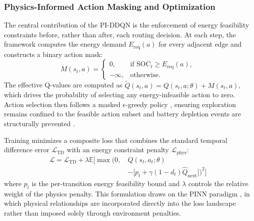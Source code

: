 \documentclass[conference]{IEEEtran}
\begin{document}
\subsubsection{Physics-Informed Action Masking and Optimization}
The central contribution of the PI-DDQN is the enforcement of energy feasibility constraints before, rather than after, each routing decision. At each step, the framework computes the energy demand $E_{\text{req}}(a)$ for every adjacent edge and constructs a binary action mask:
\begin{equation}
M(s_t, a) = 
\begin{cases}
0, & \text{if } \text{SOC}_t \ge E_{\text{req}}(a),\\
-\infty, & \text{otherwise.}
\end{cases}
\end{equation}
The effective Q-values are computed as $\tilde{Q}(s_t, a) = Q(s_t, a; \theta) + M(s_t, a)$, which drives the probability of selecting any energy-infeasible action to zero. Action selection then follows a masked $\epsilon$-greedy policy \cite{sutton2018rl}, ensuring exploration remains confined to the feasible action subset and battery depletion events are structurally prevented \cite{zhang2023ddqnper}.

Training minimizes a composite loss that combines the standard temporal difference error $\mathcal{L}_{\text{TD}}$ with an energy constraint penalty $\mathcal{L}_{\text{phys}}$:
\begin{equation}
\begin{aligned}
\mathcal{L} = \mathcal{L}_{\text{TD}} + \lambda \mathbb{E} \bigg[ \max \Big(0, \, & Q(s_t, a_t; \theta) \\
& - \big[ p_t + \gamma(1-d_t)\hat{Q}_{\text{next}} \big] \Big)^2 \bigg]
\end{aligned}
\end{equation}
where $p_t$ is the per-transition energy feasibility bound and $\lambda$ controls the relative weight of the physics penalty. This formulation draws on the PINN paradigm \cite{raissi2019pinn}, in which physical relationships are incorporated directly into the loss landscape rather than imposed solely through environment penalties.
\end{document}
